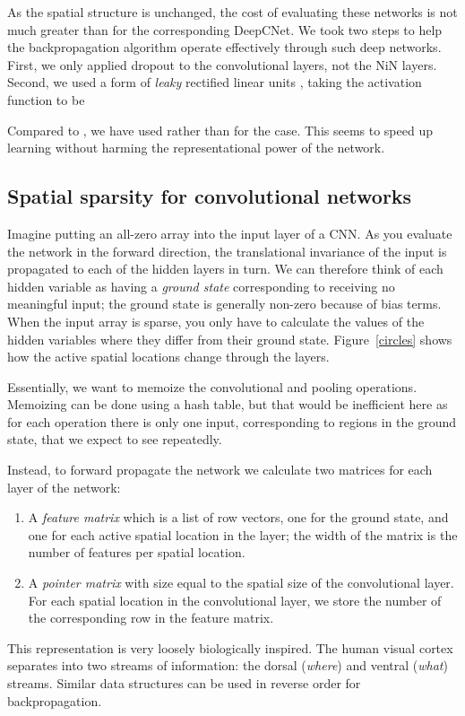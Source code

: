 \documentclass{article}
\numberwithin{equation}{subsection}
\newenvironment{circlist}{
  \begin{enumerate}[]
  \setlength{\itemsep}{0pt}
  \setlength{\parskip}{0pt}
  \setlength{\parsep}{0pt}
}{\end{enumerate}}
\begin{document}
As the spatial structure is unchanged, the cost of evaluating these networks is not much greater than for the corresponding DeepCNet. We took two steps to help the backpropagation algorithm operate effectively through such deep networks. First, we only applied dropout to the convolutional layers, not the NiN layers. Second, we used a form of {\em leaky} rectified linear units \cite{LEAKYRELU}, taking the activation function to be

Compared to \cite{LEAKYRELU}, we have used  rather than  for the  case. This seems to speed up learning without harming the representational power of the network.

\subsection{Spatial sparsity for convolutional networks}\label{sparsity}
Imagine putting an all-zero array into the input layer of a CNN. As you evaluate the network in the forward direction, the translational invariance of the input is propagated to each of the hidden layers in turn. We can therefore think of each hidden variable as having a {\em ground state} corresponding to receiving no meaningful input; the ground state is generally non-zero because of bias terms. When the input array is sparse, you only have to calculate the values of the hidden variables where they differ from their ground state. Figure~\ref{circles} shows how the active spatial locations change through the layers.

Essentially, we want to memoize the convolutional and pooling operations.
Memoizing can be done using a hash table, but that would be inefficient here as for each operation there is only one input, corresponding to regions in the ground state, that we expect to see repeatedly.

Instead, to forward propagate the network we calculate two matrices for each layer of the network:
\begin{circlist}
\item A {\em feature matrix} which is a list of row vectors, one for the ground state, and one for each active spatial location in the layer;
the width of the matrix is the number of features per spatial location.
\item A {\em pointer matrix} with size equal to the spatial size of the convolutional layer. For each spatial location in the convolutional layer, we store the number of the corresponding row in the feature matrix.
\end{circlist}
This representation is very loosely biologically inspired. The human visual cortex separates into two streams of information: the dorsal ({\em where}) and ventral ({\em what}) streams.
Similar data structures can be used in reverse order for backpropagation.
\end{document}
